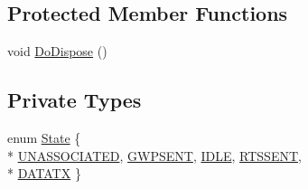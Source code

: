 \subsection*{Protected Member Functions}
\begin{DoxyCompactItemize}
\item 
void \hyperlink{classns3_1_1UanMacRc_a473088e7af262f77ad43243c2d5302c7}{Do\+Dispose} ()
\end{DoxyCompactItemize}
\subsection*{Private Types}
\begin{DoxyCompactItemize}
\item 
enum \hyperlink{classns3_1_1UanMacRc_ae0dd4b900c5884e250232711ef8274a7}{State} \{ \\*
\hyperlink{classns3_1_1UanMacRc_ae0dd4b900c5884e250232711ef8274a7ac0e1ca99452791695cdc75433d556cbf}{U\+N\+A\+S\+S\+O\+C\+I\+A\+T\+ED}, 
\hyperlink{classns3_1_1UanMacRc_ae0dd4b900c5884e250232711ef8274a7ab3e3abb68aeddfd1bc91457a480434f5}{G\+W\+P\+S\+E\+NT}, 
\hyperlink{classns3_1_1UanMacRc_ae0dd4b900c5884e250232711ef8274a7a83621357b1bf03374c67e87b965da796}{I\+D\+LE}, 
\hyperlink{classns3_1_1UanMacRc_ae0dd4b900c5884e250232711ef8274a7a9806ccb79586d29fd2fdccb7bd0efbe0}{R\+T\+S\+S\+E\+NT}, 
\\*
\hyperlink{classns3_1_1UanMacRc_ae0dd4b900c5884e250232711ef8274a7a70a067343ee8975d3df1b2b38d3cdfa8}{D\+A\+T\+A\+TX}
 \}
\end{DoxyCompactItemize}
